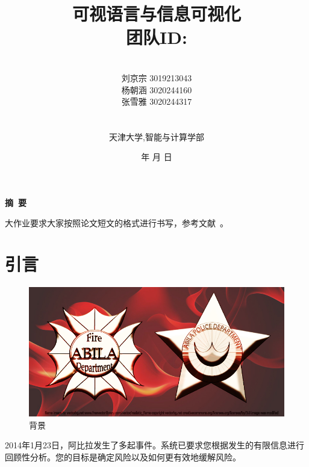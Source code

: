 \documentclass[a4paper]{article}
\begin{document}
\renewcommand{\contentsname}{目\ 录}
\renewcommand{\appendixname}{附录}
\renewcommand{\appendixpagename}{附录}
\renewcommand{\refname}{参考文献}

\renewcommand{\tablename}{表}
\renewcommand{\today}{\number\year 年 \number\month 月 \number\day 日}

\title{{\Huge 可视语言与信息可视化{\large\linebreak\\}}{\Large 团队ID: \linebreak}
{\Large  \linebreak\linebreak}}
\author{ \\
  刘京宗 3019213043
  \\
  杨朝涵 3020244160
  \\
  张雪雅 3020244317
  \\\\\\
  天津大学,智能与计算学部}
\date{\today}
\maketitle
\newpage

\begin{center}
  \tableofcontents\label{c}
\end{center}
\newpage


\begin{center}
  {\Large\bf{摘\ 要\\}}

  大作业要求大家按照论文短文的格式进行书写，参考文献~\cite{bayrak2020pragma, govyadinov2019graph}。



\end{center}

\newpage



\section{引言}
\label{overview}
\begin{figure}[htbp]
  \centering
  \includegraphics[width=1\textwidth]{images/MC3.jpg}
  \caption{背景}\label{fig:MC3}
  \vspace{\baselineskip}
\end{figure}
2014年1月23日，阿比拉发生了多起事件。系统已要求您根据发生的有限信息进行回顾性分析。您的目标是确定风险以及如何更有效地缓解风险。
\end{document}
